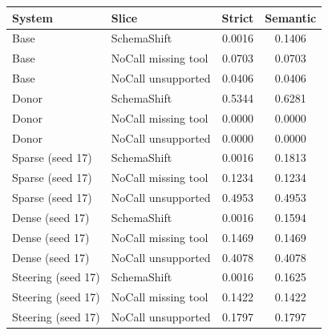 
\begin{tabular}{llSS}
\toprule
System & Slice & {Strict} & {Semantic} \\
\midrule
Base & SchemaShift & 0.0016 & 0.1406 \\
Base & NoCall missing tool & 0.0703 & 0.0703 \\
Base & NoCall unsupported & 0.0406 & 0.0406 \\
\addlinespace
Donor & SchemaShift & 0.5344 & 0.6281 \\
Donor & NoCall missing tool & 0.0000 & 0.0000 \\
Donor & NoCall unsupported & 0.0000 & 0.0000 \\
\addlinespace
Sparse (seed 17) & SchemaShift & 0.0016 & 0.1813 \\
Sparse (seed 17) & NoCall missing tool & 0.1234 & 0.1234 \\
Sparse (seed 17) & NoCall unsupported & 0.4953 & 0.4953 \\
\addlinespace
Dense (seed 17) & SchemaShift & 0.0016 & 0.1594 \\
Dense (seed 17) & NoCall missing tool & 0.1469 & 0.1469 \\
Dense (seed 17) & NoCall unsupported & 0.4078 & 0.4078 \\
\addlinespace
Steering (seed 17) & SchemaShift & 0.0016 & 0.1625 \\
Steering (seed 17) & NoCall missing tool & 0.1422 & 0.1422 \\
Steering (seed 17) & NoCall unsupported & 0.1797 & 0.1797 \\
\bottomrule
\end{tabular}
